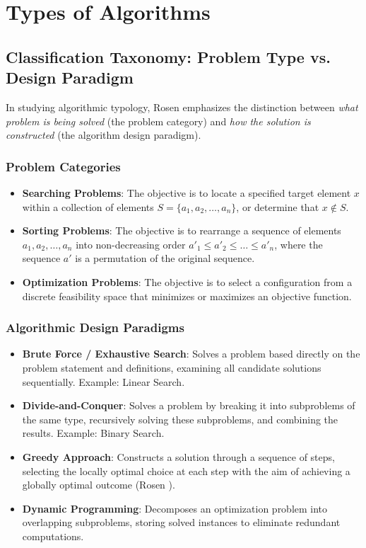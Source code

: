 \documentclass[11pt,a4paper,oneside]{report}
\theoremstyle{definition}
\begin{document}
\chapter{Types of Algorithms}
\label{chap:types_of_algorithms}

\section{Classification Taxonomy: Problem Type vs. Design Paradigm}
In studying algorithmic typology, Rosen \cite[\S3.1]{Rosen2019} emphasizes the distinction between \emph{what problem is being solved} (the problem category) and \emph{how the solution is constructed} (the algorithm design paradigm).

\subsection{Problem Categories}
\begin{itemize}
    \item \textbf{Searching Problems}: The objective is to locate a specified target element $x$ within a collection of elements $S = \{a_1, a_2, \dots, a_n\}$, or determine that $x \notin S$.
    \item \textbf{Sorting Problems}: The objective is to rearrange a sequence of elements $a_1, a_2, \dots, a_n$ into non-decreasing order $a'_1 \le a'_2 \le \dots \le a'_n$, where the sequence $a'$ is a permutation of the original sequence.
    \item \textbf{Optimization Problems}: The objective is to select a configuration from a discrete feasibility space that minimizes or maximizes an objective function.
\end{itemize}

\subsection{Algorithmic Design Paradigms}
\begin{itemize}
    \item \textbf{Brute Force / Exhaustive Search}: Solves a problem based directly on the problem statement and definitions, examining all candidate solutions sequentially. Example: Linear Search.
    \item \textbf{Divide-and-Conquer}: Solves a problem by breaking it into subproblems of the same type, recursively solving these subproblems, and combining the results. Example: Binary Search.
    \item \textbf{Greedy Approach}: Constructs a solution through a sequence of steps, selecting the locally optimal choice at each step with the aim of achieving a globally optimal outcome (Rosen \cite[\S3.1]{Rosen2019}).
    \item \textbf{Dynamic Programming}: Decomposes an optimization problem into overlapping subproblems, storing solved instances to eliminate redundant computations.
\end{itemize}
\end{document}
